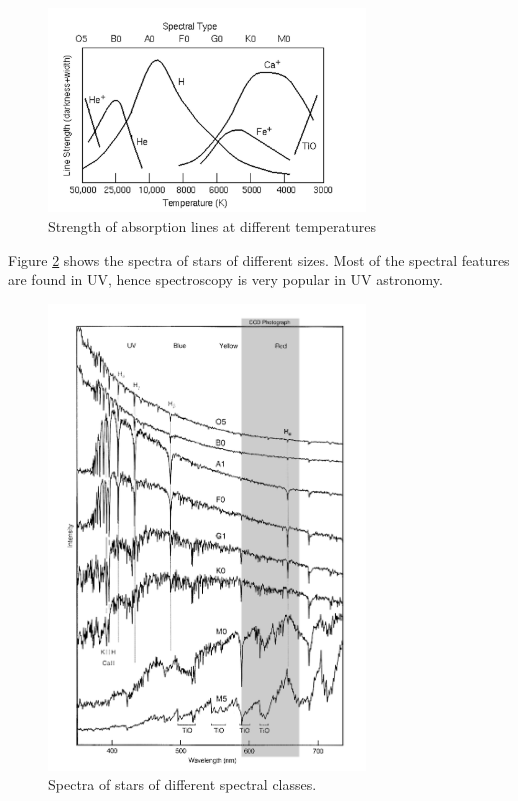 \documentclass[12pt,a4paper]{article}
\begin{document}
    \begin{figure}[H]
      \centering
      \includegraphics[width=0.75\textwidth]{Pictures/Line_strength.png}
      \caption{Strength of absorption lines at different temperatures}
      \label{fig:abs_lines}
    \end{figure}
    Figure \ref{fig:spec_class} shows the spectra of stars of different sizes. Most of the spectral features are found in UV, hence spectroscopy is very popular in UV astronomy. 
    
    \begin{figure}[H]
      \centering
      \includegraphics[width=0.75\textwidth]{Pictures/Spectral_class.png}
      \caption{Spectra of stars of different spectral classes.}
      \label{fig:spec_class}
    \end{figure}
\end{document}
